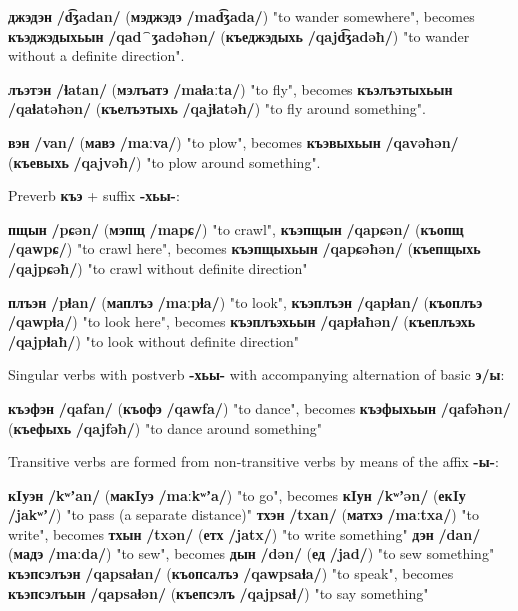 \documentclass[a4paper,12pt]{book}
\newcommand{\1}[1]{\textbf{\emph{#1}}} %
\newcommand{\2}[1]{\textbf{[#1]}} %
\newcommand{\3}[1]{\fontsize{11pt}{0cm}\textbf{\emph{#1}}} %
\newcommand{\4}[1]{\fontsize{10pt}{0cm}\emph{#1}}	%
\newcommand{\5}[1]{\textbf{/#1/}} %
\newcommand{\6}[1]{\textbf{[#1]}} %
\newcommand{\7}[1]{\fontsize{12pt}{0cm}\emph{#1}} %
\newcommand{\8}[1]{\fontsize{12pt}{0cm}`#1'} %
\newcommand{\9}[1]{\fontsize{12pt}{0cm}(lit. `#1')} %
\newcommand{\glossphonemics}[1]{\textbf{/#1/}} %
\begin{document}
\begin{xlist}
\begin{xlist}
\ex \textbf{джэдэн} \glossphonemics{d͡ʒadan} (\textbf{мэджэдэ}  \glossphonemics{mad͡ʒada}) "to wander somewhere", becomes \textbf{къэджэдыхьын} \glossphonemics{qad⁀ʒadəħən} (\textbf{къеджэдыхь}  \glossphonemics{qajd͡ʒadəħ}) "to wander without a definite direction".

\ex \textbf{лъэтэн} \glossphonemics{ɬatan} (\textbf{мэлъатэ}  \glossphonemics{maɬaːta}) "to fly", becomes \textbf{къэлъэтыхьын} \glossphonemics{qaɬatəħən} (\textbf{къелъэтыхь}  \glossphonemics{qajɬatəħ}) "to fly around something".

\ex \textbf{вэн} \glossphonemics{van} (\textbf{мавэ}  \glossphonemics{maːva}) "to plow", becomes \textbf{къэвыхьын} \glossphonemics{qavəħən} (\textbf{къевыхь}  \glossphonemics{qajvəħ}) "to plow around something".


\end{xlist}
\ex Preverb \textbf{къэ} + suffix \textbf{-хьы-}: 
\begin{xlist}

\ex \textbf{пщын} \glossphonemics{pɕən} (\textbf{мэпщ} \glossphonemics{mapɕ}) "to crawl", \textbf{къэпщын} \glossphonemics{qapɕən} (\textbf{къопщ} \glossphonemics{qawpɕ}) "to crawl here", becomes \textbf{къэпщыхьын} \glossphonemics{qapɕəħən} (\textbf{къепщыхь} \glossphonemics{qajpɕəħ}) "to crawl without definite direction"

\ex \textbf{плъэн} \glossphonemics{pɬan} (\textbf{маплъэ} \glossphonemics{maːpɬa}) "to look", \textbf{къэплъэн} \glossphonemics{qapɬan} (\textbf{къоплъэ} \glossphonemics{qawpɬa}) "to look here", becomes \textbf{къэплъэхьын} \glossphonemics{qapɬaħən} (\textbf{къеплъэхь} \glossphonemics{qajpɬaħ}) "to look without definite direction"

\end{xlist}

\ex Singular verbs with postverb \textbf{-хьы-} with accompanying alternation of basic \textbf{э/ы}:
	\begin{xlist}
	\ex \textbf{къэфэн} \glossphonemics{qafan} (\textbf{къофэ} \glossphonemics{qawfa}) "to dance", becomes \textbf{къэфыхьын} \glossphonemics{qafəħən} (\textbf{къефыхь} \glossphonemics{qajfəħ}) "to dance around something"
	\end{xlist}

\ex Transitive verbs are formed from non-transitive verbs by means of the affix \textbf{-ы-}:
	\begin{xlist}
	\ex \textbf{кIуэн} \glossphonemics{kʷʼan} (\textbf{макIуэ} \glossphonemics{maːkʷʼa}) "to go", becomes \textbf{кIун} \glossphonemics{kʷʼən} (\textbf{екIу} \glossphonemics{jakʷʼ}) "to pass (a separate distance)"
	\ex \textbf{тхэн} \glossphonemics{txan} (\textbf{матхэ} \glossphonemics{maːtxa}) "to write", becomes \textbf{тхын} \glossphonemics{txən} (\textbf{етх} \glossphonemics{jatx}) "to write something"
	\ex \textbf{дэн} \glossphonemics{dan} (\textbf{мадэ} \glossphonemics{maːda}) "to sew", becomes \textbf{дын} \glossphonemics{dən} (\textbf{ед} \glossphonemics{jad}) "to sew something"
	\ex \textbf{къэпсэлъэн} \glossphonemics{qapsaɬan} (\textbf{къопсалъэ} \glossphonemics{qawpsaɬa}) "to speak", becomes \textbf{къэпсэлъын} \glossphonemics{qapsaɬən} (\textbf{къепсэлъ} \glossphonemics{qajpsaɬ}) "to say something"
	

\end{xlist}
\end{xlist}
\end{document}
